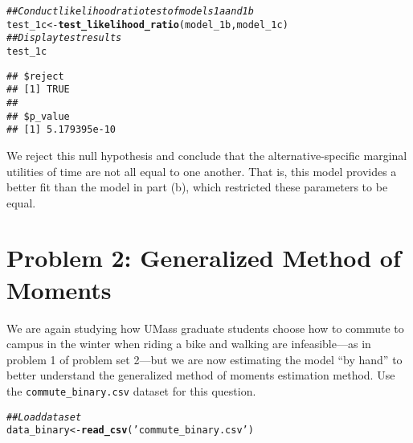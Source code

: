 \documentclass[11pt,letterpaper]{article}\usepackage[]{graphicx}\usepackage[]{xcolor}
\makeatletter
\newcommand{\hlstr}[1]{\textcolor[rgb]{0.192,0.494,0.8}{#1}}%
\newcommand{\hlcom}[1]{\textcolor[rgb]{0.678,0.584,0.686}{\textit{#1}}}%
\newcommand{\hlstd}[1]{\textcolor[rgb]{0.345,0.345,0.345}{#1}}%
\newcommand{\hlkwb}[1]{\textcolor[rgb]{0.69,0.353,0.396}{#1}}%
\newcommand{\hlkwd}[1]{\textcolor[rgb]{0.737,0.353,0.396}{\textbf{#1}}}%
\newenvironment{kframe}{%
 \def\at@end@of@kframe{}%
 \ifinner\ifhmode%
  \def\at@end@of@kframe{\end{minipage}}%
  \begin{minipage}{\columnwidth}%
 \fi\fi%
 \def\FrameCommand##1{\hskip\@totalleftmargin \hskip-\fboxsep
 \colorbox{shadecolor}{##1}\hskip-\fboxsep
     \hskip-\linewidth \hskip-\@totalleftmargin \hskip\columnwidth}%
 \MakeFramed {\advance\hsize-\width
   \@totalleftmargin\z@ \linewidth\hsize
   \@setminipage}}%
 {\par\unskip\endMakeFramed%
 \at@end@of@kframe}
\newenvironment{knitrout}{}{} %
\makeatother
\begin{document}
\begin{enumerate}[label=\alph*., leftmargin=*]
\begin{enumerate}[label=\roman*.]
\begin{knitrout}
\color{fgcolor}\begin{kframe}
\begin{alltt}
\hlcom{## Conduct likelihood ratio test of models 1a and 1b}
\hlstd{test_1c} \hlkwb{<-} \hlkwd{test_likelihood_ratio}\hlstd{(model_1b, model_1c)}
\hlcom{## Display test results}
\hlstd{test_1c}
\end{alltt}
\begin{verbatim}
## $reject
## [1] TRUE
## 
## $p_value
## [1] 5.179395e-10
\end{verbatim}
\end{kframe}
\end{knitrout}

		We reject this null hypothesis and conclude that the alternative-specific marginal utilities of time are not all equal to one another. That is, this model provides a better fit than the model in part (b), which restricted these parameters to be equal.
	\end{enumerate}
\end{enumerate}

\section*{Problem 2: Generalized Method of Moments}

We are again studying how UMass graduate students choose how to commute to campus in the winter when riding a bike and walking are infeasible---as in problem 1 of problem set 2---but we are now estimating the model ``by hand'' to better understand the generalized method of moments estimation method. Use the \texttt{commute\_binary.csv} dataset for this question.

\begin{knitrout}
\color{fgcolor}\begin{kframe}
\begin{alltt}
\hlcom{## Load dataset}
\hlstd{data_binary} \hlkwb{<-} \hlkwd{read_csv}\hlstd{(}\hlstr{'commute_binary.csv'}\hlstd{)}
\end{alltt}


{\ttfamily\noindent\itshape{}}\end{kframe}
\end{knitrout}
\end{document}
